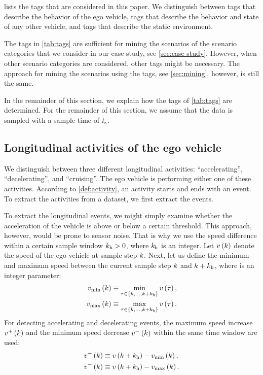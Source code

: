 \cstarta
{} lists the tags that are considered in this paper. 
We distinguish between tags that describe the behavior of the ego vehicle, tags that describe the behavior and state of any other vehicle, and tags that describe the static environment. 
\begin{remark}
	The tags in \cref{tab:tags} are sufficient for mining the scenarios of the scenario categories that we consider in our case study, see \cref{sec:case study}. However, when other scenario categories are considered, other tags might be necessary. The approach for mining the scenarios using the tags, see \cref{sec:mining}, however, is still the same.
\end{remark}
\cenda

In the remainder of this section, we explain how the tags of \cref{tab:tags} are determined. 
For the remainder of this section, we assume that the data is sampled with a sample time of $t_\mathrm{s}$.



\subsection{Longitudinal activities of the ego vehicle}
\label{sec:longitudinal ego}

We distinguish between three different longitudinal activities: ``accelerating'', ``decelerating'', and ``cruising''. 
The ego vehicle is performing either one of these activities. 
According to \cref{def:activity}, an activity starts and ends with an event. 
To extract the activities from a dataset, we first extract the events. 

\cstarta To extract the longitudinal events, we might simply examine whether the acceleration of the vehicle is above or below a certain threshold. 
This approach, however, would be prone to sensor noise. 
That is why we use the speed difference within a certain sample window $k_{\mathrm{h}}>0$, where $k_{\mathrm{h}}$ is an integer.
Let $v\left(k\right)$ denote the speed of the ego vehicle at sample step $k$. 
Next, let us define the minimum and maximum speed between the current sample step $k$ and $k+k_{\mathrm{h}}$, where  is an integer parameter:
\begin{align}
	v_\mathrm{min}\left(k\right) &\equiv \min_{\tau \in \left\{ k, \ldots, k+k_{\mathrm{h}} \right\} } v\left(\tau\right), \\
	v_\mathrm{max}\left(k\right) &\equiv \max_{\tau \in \left\{ k, \ldots, k+k_{\mathrm{h}} \right\} } v\left(\tau\right).
\end{align}\cenda
For detecting accelerating and decelerating events, the maximum speed increase $v^{+}\left(k\right)$ and the minimum speed decrease $v^{-}\left(k\right)$ within the same time window are used:
\begin{align}
	v^{+}\left(k\right) &\equiv v\left(k + k_{\mathrm{h}}\right) - v_\mathrm{min}\left(k\right),\\
	v^{-}\left(k\right) &\equiv v\left(k + k_{\mathrm{h}}\right) - v_\mathrm{max}\left(k\right).
\end{align}

